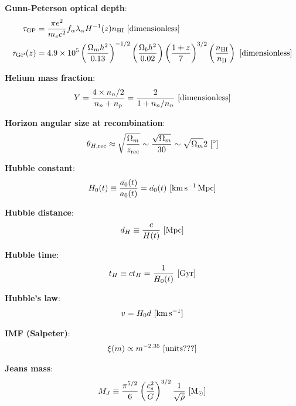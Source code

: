 \documentclass[a4paper,11pt]{article}
\begin{document}
{\noindent}\textbf{Gunn-Peterson optical depth}:
\begin{align*}
    \tau_\mathrm{GP} &= \frac{\pi e^2}{m_ec^2}f_\alpha\lambda_\alpha H^{-1}(z)n_\mathrm{HI} ~ [{\rm dimensionless}] \\
    \tau_\mathrm{GP}(z) &= 4.9\times10^5 \left(\frac{\Omega_mh^2}{0.13}\right)^{-1/2} \left(\frac{\Omega_bh^2}{0.02}\right) \left(\frac{1+z}{7}\right)^{3/2} \left(\frac{n_\mathrm{HI}}{n_\mathrm{H}}\right) ~ [{\rm dimensionless}]
\end{align*}

{\noindent}\textbf{Helium mass fraction}:
\begin{align*}
    Y = \frac{4\times n_n/2}{n_n + n_p}  = \frac{2}{1 + n_n/n_n} ~ [{\rm dimensionless}]
\end{align*}

{\noindent}\textbf{Horizon angular size at recombination}:
\begin{align*}
    \theta_{H,\mathrm{rec}} \approx \sqrt{\frac{\Omega_m}{z_\mathrm{rec}}} \sim \frac{\sqrt{\Omega_m}}{30} \sim \sqrt{\Omega_m}2 ~ [{\rm ^\circ}]
\end{align*}

{\noindent}\textbf{Hubble constant}:
\begin{align*}
    H_0(t) \equiv \dfrac{\dot{a_0}(t)}{a_0(t)} = \dot{a_0}(t) ~ [{\rm km\,s^{-1}\,Mpc}]
\end{align*}

{\noindent}\textbf{Hubble distance}:
\begin{align*}
    d_H \equiv \frac{c}{H(t)} ~ [{\rm Mpc}]
\end{align*}

{\noindent}\textbf{Hubble time}:
\begin{align*}
    t_H \equiv ct_H = \frac{1}{H_0(t)} ~ [{\rm Gyr}]
\end{align*}

{\noindent}\textbf{Hubble's law}:
\begin{align*}
    v = H_0d ~ [{\rm km\,s^{-1}}]
\end{align*}

{\noindent}\textbf{IMF (Salpeter)}:
\begin{align*}
    \xi(m) \propto m^{-2.35} ~ [{\rm units???}]
\end{align*}

{\noindent}\textbf{Jeans mass}:
\begin{align*}
    M_J \equiv \frac{\pi^{5/2}}{6}\left(\frac{c_s^2}{G}\right)^{3/2}\frac{1}{\sqrt{\bar{\rho}}} ~ [{\rm M_\odot}]
\end{align*}
\end{document}
